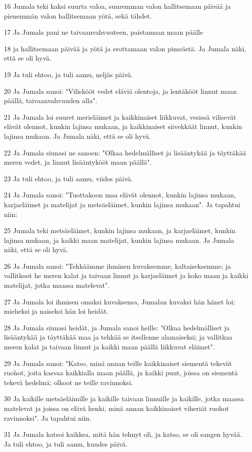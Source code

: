 \par 16 Jumala teki kaksi suurta valoa, suuremman valon hallitsemaan päivää ja pienemmän valon hallitsemaan yötä, sekä tähdet.
\par 17 Ja Jumala pani ne taivaanvahvuuteen, paistamaan maan päälle
\par 18 ja hallitsemaan päivää ja yötä ja erottamaan valon pimeästä. Ja Jumala näki, että se oli hyvä.
\par 19 Ja tuli ehtoo, ja tuli aamu, neljäs päivä.
\par 20 Ja Jumala sanoi: "Viliskööt vedet eläviä olentoja, ja lentäkööt linnut maan päällä, taivaanvahvuuden alla".
\par 21 Ja Jumala loi suuret merieläimet ja kaikkinaiset liikkuvat, vesissä vilisevät elävät olennot, kunkin lajinsa mukaan, ja kaikkinaiset siivekkäät linnut, kunkin lajinsa mukaan. Ja Jumala näki, että se oli hyvä.
\par 22 Ja Jumala siunasi ne sanoen: "Olkaa hedelmälliset ja lisääntykää ja täyttäkää meren vedet, ja linnut lisääntykööt maan päällä".
\par 23 Ja tuli ehtoo, ja tuli aamu, viides päivä.
\par 24 Ja Jumala sanoi: "Tuottakoon maa elävät olennot, kunkin lajinsa mukaan, karjaeläimet ja matelijat ja metsäeläimet, kunkin lajinsa mukaan". Ja tapahtui niin:
\par 25 Jumala teki metsäeläimet, kunkin lajinsa mukaan, ja karjaeläimet, kunkin lajinsa mukaan, ja kaikki maan matelijat, kunkin lajinsa mukaan. Ja Jumala näki, että se oli hyvä.
\par 26 Ja Jumala sanoi: "Tehkäämme ihminen kuvaksemme, kaltaiseksemme; ja vallitkoot he meren kalat ja taivaan linnut ja karjaeläimet ja koko maan ja kaikki matelijat, jotka maassa matelevat".
\par 27 Ja Jumala loi ihmisen omaksi kuvaksensa, Jumalan kuvaksi hän hänet loi; mieheksi ja naiseksi hän loi heidät.
\par 28 Ja Jumala siunasi heidät, ja Jumala sanoi heille: "Olkaa hedelmälliset ja lisääntykää ja täyttäkää maa ja tehkää se itsellenne alamaiseksi; ja vallitkaa meren kalat ja taivaan linnut ja kaikki maan päällä liikkuvat eläimet".
\par 29 Ja Jumala sanoi: "Katso, minä annan teille kaikkinaiset siementä tekevät ruohot, joita kasvaa kaikkialla maan päällä, ja kaikki puut, joissa on siementä tekevä hedelmä; olkoot ne teille ravinnoksi.
\par 30 Ja kaikille metsäeläimille ja kaikille taivaan linnuille ja kaikille, jotka maassa matelevat ja joissa on elävä henki, minä annan kaikkinaiset viheriät ruohot ravinnoksi". Ja tapahtui niin.
\par 31 Ja Jumala katsoi kaikkea, mitä hän tehnyt oli, ja katso, se oli sangen hyvää. Ja tuli ehtoo, ja tuli aamu, kuudes päivä.

